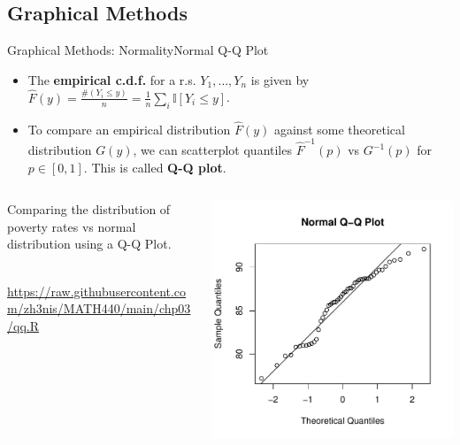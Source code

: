\documentclass{beamer}
\begin{document}
\subsection{Graphical Methods}
\begin{frame}[fragile]{Graphical Methods: Normality}{Normal Q-Q Plot}
\begin{itemize}
    \item The \textbf{empirical c.d.f.} for a r.s. $Y_1,\ldots,Y_n$ is given by $\hat{F}(y)=\frac{\#(Y_i\le y)}{n}=\frac1n\sum_i\mathbb{I}[Y_i\le y]$.
    \item \pause To compare an empirical distribution $\hat{F}(y)$ against some theoretical distribution $G(y)$, we can scatterplot quantiles $\hat{F}^{-1}(p)$ vs $G^{-1}(p)$ for $p\in[0,1]$. \pause This is called \textbf{Q-Q plot}.
\end{itemize} 
\pause
\begin{columns}
\begin{column}{.5\textwidth}
Comparing the distribution of poverty rates vs normal distribution using a Q-Q Plot.\\~\\
\begin{footnotesize}
{\color{blue}\url{https://raw.githubusercontent.com/zh3nis/MATH440/main/chp03/qq.R}}
\end{footnotesize}
\end{column}
\begin{column}{.5\textwidth}
\includegraphics[width=\textwidth]{plots/qq_pov.pdf}
\end{column}
\end{columns}
\end{frame}
\end{document}
